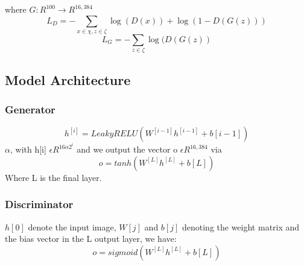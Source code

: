 \documentclass[conference]{IEEEtran}
\begin{document}
where \begin{math}G : R^{100} \longrightarrow R^{16,384}\end{math}
\begin{equation}
L_D = - \sum_{x \in \chi, z \in \zeta} \log(D(x)) + \log(1 - D(G(z))) \tag{6}
\end{equation}
\begin{equation}
L_G = - \sum_{z \in \zeta} \log(D(G(z)) \tag{7}
\end{equation}

\subsection{Model Architecture}

\subsubsection{Generator}

\begin{equation}
h^{[i]} = LeakyRELU(W^{[i-1]}h^{[i-1]}+b{[i-1]})\label{Gen LeakyRELU}
\end{equation}
\begin{math}\alpha \end{math}, with h[i] \begin{math}\epsilon R^{16\alpha2^i}\end{math} and we output the vector o \begin{math}\epsilon R^{16,384}\end{math} via
\begin{equation}
o =tanh(W^{[L]}h^{[L]}+b{[L]})
\end{equation}
Where L is the final layer.

\subsubsection{Discriminator}
\begin{math}h[0]\end{math} denote the input
image, \begin{math}W [j]\end{math} and \begin{math}b[j]\end{math} denoting the weight matrix and the bias vector in the L output layer, we have:
\begin{equation}
o = sigmoid(W^{[L]}h^{[L]}+b{[L]})
\end{equation}
\end{document}
